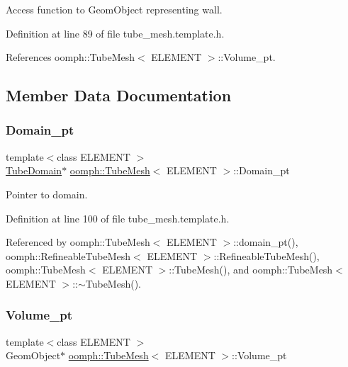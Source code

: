 Access function to Geom\+Object representing wall. 



Definition at line 89 of file tube\+\_\+mesh.\+template.\+h.



References oomph\+::\+Tube\+Mesh$<$ E\+L\+E\+M\+E\+N\+T $>$\+::\+Volume\+\_\+pt.



\subsection{Member Data Documentation}
\mbox{\label{classoomph_1_1TubeMesh_aa40f91e3d55b4ab61304d0b8eca3859f}} 
\subsubsection{\texorpdfstring{Domain\+\_\+pt}{Domain\_pt}}
{\footnotesize\ttfamily template$<$class E\+L\+E\+M\+E\+NT $>$ \\
\hyperlink{classoomph_1_1TubeDomain}{Tube\+Domain}$\ast$ \hyperlink{classoomph_1_1TubeMesh}{oomph\+::\+Tube\+Mesh}$<$ E\+L\+E\+M\+E\+NT $>$\+::Domain\+\_\+pt\hspace{0.3cm}{\ttfamily [protected]}}



Pointer to domain. 



Definition at line 100 of file tube\+\_\+mesh.\+template.\+h.



Referenced by oomph\+::\+Tube\+Mesh$<$ E\+L\+E\+M\+E\+N\+T $>$\+::domain\+\_\+pt(), oomph\+::\+Refineable\+Tube\+Mesh$<$ E\+L\+E\+M\+E\+N\+T $>$\+::\+Refineable\+Tube\+Mesh(), oomph\+::\+Tube\+Mesh$<$ E\+L\+E\+M\+E\+N\+T $>$\+::\+Tube\+Mesh(), and oomph\+::\+Tube\+Mesh$<$ E\+L\+E\+M\+E\+N\+T $>$\+::$\sim$\+Tube\+Mesh().

\mbox{\label{classoomph_1_1TubeMesh_a3b89c07eff15d0eb9d5fe9e0c93f8ec2}} 
\subsubsection{\texorpdfstring{Volume\+\_\+pt}{Volume\_pt}}
{\footnotesize\ttfamily template$<$class E\+L\+E\+M\+E\+NT $>$ \\
Geom\+Object$\ast$ \hyperlink{classoomph_1_1TubeMesh}{oomph\+::\+Tube\+Mesh}$<$ E\+L\+E\+M\+E\+NT $>$\+::Volume\+\_\+pt\hspace{0.3cm}{\ttfamily [protected]}}



